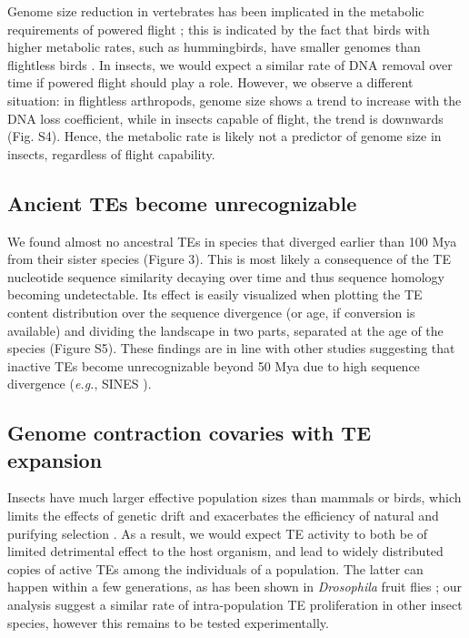 Genome size reduction in vertebrates has been implicated in the
metabolic requirements of powered flight \citep{Wright2014}; this is
indicated by the fact that birds with higher metabolic rates, such as
hummingbirds, have smaller genomes than flightless birds
\citep{Gregory2005}. In insects, we would expect a similar rate of DNA
removal over time if powered flight should play a role. However, we
observe a different situation: in flightless arthropods, genome size
shows a trend to increase with the DNA loss coefficient, while in
insects capable of flight, the trend is downwards (Fig. S4). Hence, the
metabolic rate is likely not a predictor of genome size in insects,
regardless of flight capability.

\subsection*{Ancient TEs become
unrecognizable}\label{ancient-tes-become-unrecognizable}

We found almost no ancestral TEs in species that diverged earlier than
100 Mya from their sister species (Figure 3). This is most likely a
consequence of the TE nucleotide sequence similarity decaying over time
and thus sequence homology becoming undetectable. Its effect is easily
visualized when plotting the TE content distribution over the sequence
divergence (or age, if conversion is available) and dividing the
landscape in two parts, separated at the age of the species (Figure S5).
These findings are in line with other studies suggesting that inactive
TEs become unrecognizable beyond 50 Mya due to high sequence divergence
(\emph{e.g.}, SINES \citep{Shedlock2000}).

\subsection*{Genome contraction covaries with TE
expansion}\label{genome-contraction-covaries-with-te-expansion}

Insects have much larger effective population sizes than mammals or
birds, which limits the effects of genetic drift and exacerbates the
efficiency of natural and purifying selection \citep{Szitenberg2016}. As a
result, we would expect TE activity to both be of limited detrimental
effect to the host organism, and lead to widely distributed copies of
active TEs among the individuals of a population. The latter can happen
within a few generations, as has been shown in \emph{Drosophila} fruit
flies \citep{Kofler_2015}; our analysis suggest a similar rate of
intra-population TE proliferation in other insect species, however this
remains to be tested experimentally.

